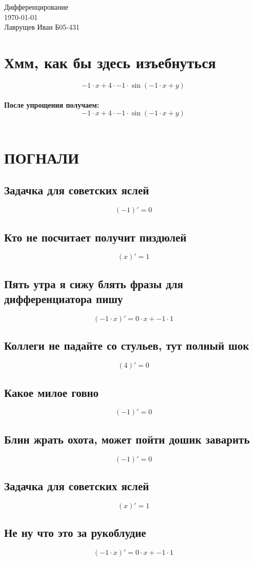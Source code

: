 \documentclass[12pt]{article}
\begin{document}
\begingroup
    \centering
    \LARGE Дифференцирование\\
    \large \today \\[0.5em]
    \large Лаврущев Иван Б05-431\par
\endgroup
\tableofcontents
\section{Хмм, как бы здесь изъебнуться}
$$-1 \cdot x + 4 \cdot -1 \cdot \sin(-1 \cdot x + y)$$\\
\textbf{После упрощения получаем:}\\
$$-1 \cdot x + 4 \cdot -1 \cdot \sin(-1 \cdot x + y)$$\\
\section{ПОГНАЛИ}
\subsection{Задачка для советских яслей}
$$(-1)' = 0$$
\subsection{Кто не посчитает получит пиздюлей}
$$(x)' = 1$$
\subsection{Пять утра я сижу блять фразы для дифференциатора пишу}
$$(-1 \cdot x)' = 0 \cdot x + -1 \cdot 1$$
\subsection{Коллеги не падайте со стульев, тут полный шок}
$$(4)' = 0$$
\subsection{Какое милое говно}
$$(-1)' = 0$$
\subsection{Блин жрать охота, может пойти дошик заварить}
$$(-1)' = 0$$
\subsection{Задачка для советских яслей}
$$(x)' = 1$$
\subsection{Не ну что это за рукоблудие}
$$(-1 \cdot x)' = 0 \cdot x + -1 \cdot 1$$
\end{document}
